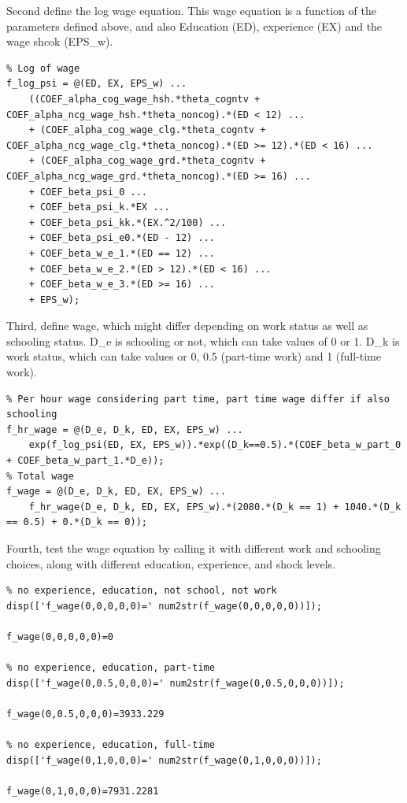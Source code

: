 \documentclass[
]{book}
\begin{document}
Second define the log wage equation. This wage equation is a function of
the parameters defined above, and also Education (ED), experience (EX)
and the wage shcok (EPS\_w).

\begin{verbatim}
% Log of wage
f_log_psi = @(ED, EX, EPS_w) ...
    ((COEF_alpha_cog_wage_hsh.*theta_cogntv + COEF_alpha_ncg_wage_hsh.*theta_noncog).*(ED < 12) ...
    + (COEF_alpha_cog_wage_clg.*theta_cogntv + COEF_alpha_ncg_wage_clg.*theta_noncog).*(ED >= 12).*(ED < 16) ...
    + (COEF_alpha_cog_wage_grd.*theta_cogntv + COEF_alpha_ncg_wage_grd.*theta_noncog).*(ED >= 16) ...
    + COEF_beta_psi_0 ...
    + COEF_beta_psi_k.*EX ...
    + COEF_beta_psi_kk.*(EX.^2/100) ...
    + COEF_beta_psi_e0.*(ED - 12) ...
    + COEF_beta_w_e_1.*(ED == 12) ...
    + COEF_beta_w_e_2.*(ED > 12).*(ED < 16) ...
    + COEF_beta_w_e_3.*(ED >= 16) ...
    + EPS_w);
\end{verbatim}

Third, define wage, which might differ depending on work status as well
as schooling status. D\_e is schooling or not, which can take values of 0
or 1. D\_k is work status, which can take values or 0, 0.5 (part-time
work) and 1 (full-time work).

\begin{verbatim}
% Per hour wage considering part time, part time wage differ if also schooling
f_hr_wage = @(D_e, D_k, ED, EX, EPS_w) ...
    exp(f_log_psi(ED, EX, EPS_w)).*exp((D_k==0.5).*(COEF_beta_w_part_0 + COEF_beta_w_part_1.*D_e));
% Total wage
f_wage = @(D_e, D_k, ED, EX, EPS_w) ...
    f_hr_wage(D_e, D_k, ED, EX, EPS_w).*(2080.*(D_k == 1) + 1040.*(D_k == 0.5) + 0.*(D_k == 0));
\end{verbatim}

Fourth, test the wage equation by calling it with different work and
schooling choices, along with different education, experience, and shock
levels.

\begin{verbatim}
% no experience, education, not school, not work
disp(['f_wage(0,0,0,0,0)=' num2str(f_wage(0,0,0,0,0))]);

f_wage(0,0,0,0,0)=0

% no experience, education, part-time
disp(['f_wage(0,0.5,0,0,0)=' num2str(f_wage(0,0.5,0,0,0))]);

f_wage(0,0.5,0,0,0)=3933.229

% no experience, education, full-time
disp(['f_wage(0,1,0,0,0)=' num2str(f_wage(0,1,0,0,0))]);

f_wage(0,1,0,0,0)=7931.2281
\end{verbatim}
\end{document}
